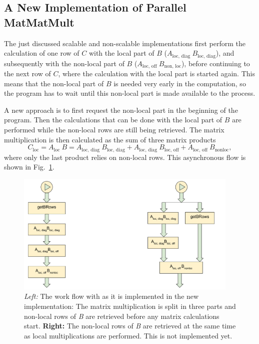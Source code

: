 \subsection{A New Implementation of Parallel MatMatMult}
\label{sec:seq_mpi}
The just discussed scalable and non-scalable implementations first perform the calculation of one row of $C$ with the local part of $B$ ($A_{\textrm{loc, diag~}} B_{\textrm{loc, diag}}$), and subsequently with the non-local part of $B$ ($A_{\textrm{loc, off~}} B_{\textrm{non, loc}}$), before continuing to the next row of $C$, where the calculation with the local part is started again. This means that the non-local part of $B$ is needed very early in the computation, so the program has to wait until this non-local part is made available to the process.

A new approach is to first request the non-local part in the beginning of the program. Then the calculations that can be done with the local part of $B$ are performed while the non-local rows are still being retrieved. The matrix multiplication is then calculated as the sum of three matrix products 
\begin{equation}
C_{\textrm{loc}} = A_{\textrm{loc~}} B = A_{\textrm{loc, diag~}} B_{\textrm{loc, diag}} + A_{\textrm{loc, diag~}} B_{\textrm{loc, off}} + A_{\textrm{loc, off~}} B_{\textrm{nonloc}},
\end{equation}
where only the last product relies on non-local rows. This asynchronous flow is shown in Fig.~\ref{fig:mpi_workflow}.

\begin{figure}[tb]
\centering
\includegraphics[width=0.95\textwidth]{mpi_workflow}
\caption{\textit{Left:} The work flow with as it is implemented in the new implementation: The matrix multiplication is split in three parts and non-local rows of \textit{B} are retrieved before any matrix calculations start. \textbf{Right:} The non-local rows of \textit{B} are retrieved at the same time as local multiplications are performed. This is not implemented yet.}
\label{fig:mpi_workflow}
\end{figure}

